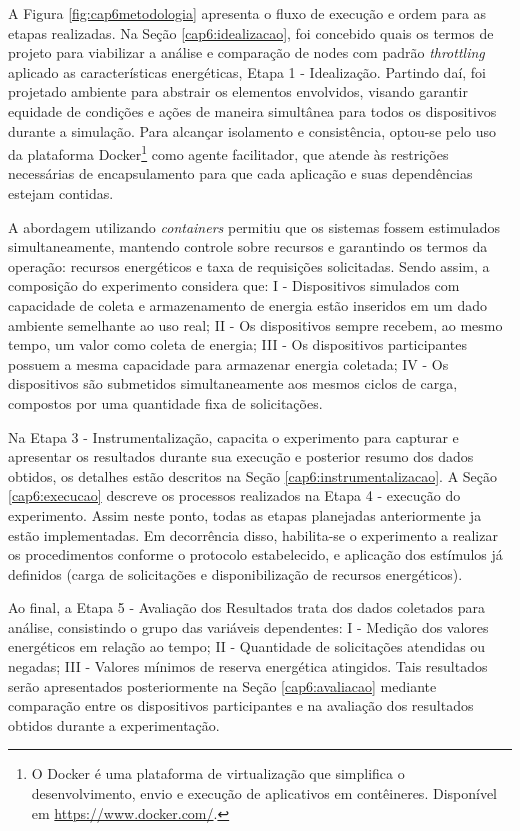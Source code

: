 A Figura \ref{fig:cap6metodologia} apresenta o fluxo de execução e ordem para as etapas realizadas. Na Seção \ref{cap6:idealizacao}, foi concebido quais os termos de projeto para viabilizar a análise e comparação de nodes com padrão \textit{throttling} aplicado as características energéticas, Etapa 1 - Idealização. Partindo daí, foi projetado ambiente para abstrair os elementos envolvidos, visando garantir equidade de condições e ações de maneira simultânea para todos os dispositivos durante a simulação. Para alcançar isolamento e consistência, optou-se pelo uso da plataforma Docker\footnote{O Docker é uma plataforma de virtualização que simplifica o desenvolvimento, envio e execução de aplicativos em contêineres. Disponível em \url{https://www.docker.com/}.} como agente facilitador, que atende às restrições necessárias de encapsulamento para que cada aplicação e suas dependências estejam contidas. 

A abordagem utilizando  \textit{containers} permitiu que os sistemas fossem estimulados simultaneamente, mantendo controle sobre recursos e garantindo os termos da operação: recursos energéticos e taxa de requisições solicitadas. Sendo assim, a composição do experimento considera que:  I - Dispositivos simulados com capacidade de coleta e armazenamento de energia estão inseridos em um dado ambiente semelhante ao uso real; II - Os dispositivos sempre recebem, ao mesmo tempo, um valor como coleta de energia; III - Os dispositivos participantes possuem a mesma capacidade para armazenar energia coletada; IV - Os dispositivos são submetidos simultaneamente aos mesmos ciclos de carga, compostos por uma quantidade fixa de solicitações.

Na Etapa 3 - Instrumentalização, capacita o experimento para capturar e apresentar os resultados durante sua execução e posterior resumo dos dados obtidos, os detalhes estão descritos na Seção \ref{cap6:instrumentalizacao}. A Seção \ref{cap6:execucao} descreve os processos realizados na Etapa 4 - execução do experimento. Assim neste ponto, todas as etapas planejadas anteriormente ja estão implementadas. Em decorrência disso, habilita-se o experimento a realizar os procedimentos conforme o protocolo estabelecido, e aplicação dos estímulos já definidos (carga de solicitações e disponibilização de recursos energéticos).

Ao final, a Etapa 5 - Avaliação dos Resultados trata dos dados coletados para análise,
consistindo o grupo das variáveis dependentes: I - Medição dos valores energéticos em relação ao tempo; II - Quantidade de solicitações atendidas ou negadas; III - Valores mínimos de reserva energética atingidos. Tais resultados serão apresentados posteriormente na Seção \ref{cap6:avaliacao} mediante comparação entre os dispositivos participantes e na avaliação dos resultados obtidos durante a experimentação.

